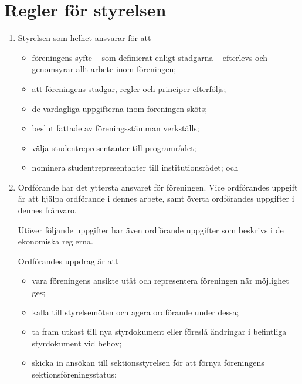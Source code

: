 \documentclass{dvd}
\begin{document}
\section{Regler för styrelsen}

	\begin{enumerate}[label=\arabic* §, ref=\arabic*]
		\item Styrelsen som helhet ansvarar för att
		\begin{itemize}
			\item föreningens syfte -- som definierat enligt stadgarna -- efterlevs och genomsyrar allt arbete inom föreningen;

			\item att föreningens stadgar, regler och principer efterföljs;

			\item de vardagliga uppgifterna inom föreningen sköts;

			\item beslut fattade av föreningsstämman verkställs;

			\item välja studentrepresentanter till programrådet;

			\item nominera studentrepresentanter till institutionsrådet; och
		\end{itemize}

		\item Ordförande har det yttersta ansvaret för föreningen.
		Vice ordförandes uppgift är att hjälpa ordförande i dennes arbete, samt överta ordförandes uppgifter i dennes frånvaro.

		Utöver följande uppgifter har även ordförande uppgifter som beskrivs i de ekonomiska reglerna.

		Ordförandes uppdrag är att
		\begin{itemize}
		\item vara föreningens ansikte utåt och representera föreningen när möjlighet ges;

		\item kalla till styrelsemöten och agera ordförande under dessa;

		\item ta fram utkast till nya styrdokument eller föreslå ändringar i befintliga styrdokument vid behov;

		\item skicka in ansökan till sektionsstyrelsen för att förnya föreningens sektionsföreningsstatus;


\end{itemize}
\end{enumerate}
\end{document}

